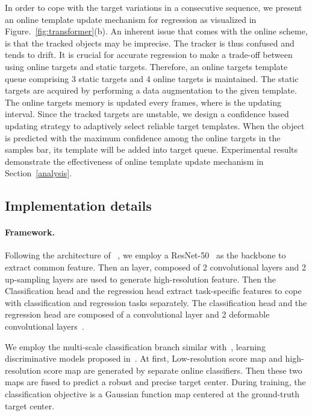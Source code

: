 \documentclass[10pt,twocolumn,letterpaper]{article}
\begin{document}
In order to cope with the target variations in a consecutive sequence, we present an online template update mechanism for regression as visualized in Figure.~\ref{fig:transformer}(b). An inherent issue that comes with the online scheme, is that the tracked objects may be imprecise. The tracker is thus confused and tends to drift. It is crucial for accurate regression to make a trade-off between using online targets and static targets. Therefore, an online targets template queue comprising 3 static targets and 4 online targets is maintained. The static targets are acquired by performing a data augmentation to the given template. The online targets memory is updated every  frames, where  is the updating interval. Since the tracked targets are unstable, we design a confidence based updating strategy to adaptively select reliable target templates.  When the object is predicted with the maximum confidence among the online targets in the samples bar, its template will be added into target queue.
Experimental results demonstrate the effectiveness of online template update mechanism in Section~\ref{analysis}.  


\subsection{Implementation details}
\paragraph{Framework.}
Following the architecture of ~\cite{dimp}, we employ a ResNet-50~\cite{resnet50} as the backbone to extract common feature. Then an  layer, composed of 2 convolutional layers and 2 up-sampling layers are used to generate high-resolution feature. 
Then the Classification head and the regression head extract task-specific features to cope with classification and regression tasks separately. The classification head and the regression head are composed of a convolutional layer and 2 deformable convolutional layers~\cite{dai2017deformable}.

We employ the multi-scale classification branch similar with~\cite{fcot}, learning discriminative models proposed in~\cite{dimp}. At first, Low-resolution score map and high-resolution score map are generated by separate online classifiers. Then these two maps are fused to predict a robust and precise target center. During training, the classification objective is a Gaussian function map centered at the ground-truth target center. 
\end{document}
